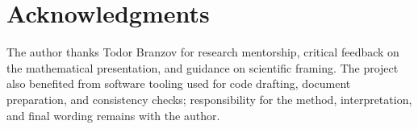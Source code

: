 \section{Acknowledgments}

The author thanks Todor Branzov for research mentorship, critical feedback on the mathematical presentation, and guidance on scientific framing. The project also benefited from software tooling used for code drafting, document preparation, and consistency checks; responsibility for the method, interpretation, and final wording remains with the author.
